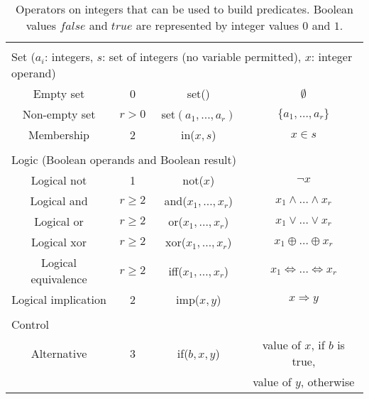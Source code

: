 \documentclass[10pt]{article}
\newcommand{\nm}[1]{\mathit{#1}} %
\begin{document}
\begin{table}[p]
\begin{center}
{\begin{tabular}{cccc}
\midrule
\multicolumn{2}{c}{ } \\
\multicolumn{4}{l}{\textcolor{dred}{Set ($a_i$: integers, $s$: set of integers (no variable permitted), $x$: integer operand)}} \\
\midrule
Empty set & 0 & set() & $\emptyset$ \\
Non-empty set & $r > 0$ & set$(a_1,\ldots,a_r)$ & $\{a_1,\ldots,a_r\}$ \\
Membership & 2 & in($x,s$) & $x \in s$ \\
\midrule
\multicolumn{2}{c}{ } \\
\multicolumn{4}{l}{\textcolor{dred}{Logic (Boolean operands and Boolean result)}} \\
\midrule
Logical not     & 1 & not($x$) & $\lnot x$ \\
Logical and    & $r \geq 2$ &  and($x_1,\ldots,x_r$) & $x_1 \land \ldots \land x_r$ \\
Logical or    & $r \geq 2$ & or($x_1,\ldots,x_r$) & $x_1 \lor \ldots \lor x_r$ \\
Logical xor    & $r \geq 2$ & xor($x_1,\ldots,x_r$) & $x_1 \oplus \ldots \oplus x_r$ \\
Logical equivalence& $r \geq 2$ & iff($x_1,\ldots,x_r$) & $x_1 \Leftrightarrow \ldots \Leftrightarrow x_r$ \\
Logical implication & 2 & imp($x,y$) & $x \Rightarrow y$ \\
\midrule
\multicolumn{2}{c}{ } \\
\multicolumn{4}{l}{\textcolor{dred}{Control}} \\
\midrule
Alternative     & 3 & if($b,x,y$) & value of $x$, if $b$ is true, \\
                &   &           & value of $y$, otherwise     \\
\bottomrule
\end{tabular}
}
\end{center}
\caption{Operators on integers that can be used to build predicates. Boolean values $\nm{false}$ and $\nm{true}$ are represented by integer values $0$ and $1$.%
\label{tab:semanticsi}}
\end{table}
\end{document}
